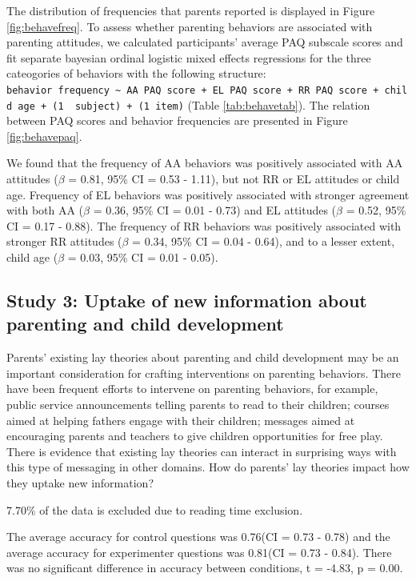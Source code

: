 \documentclass[man]{apa6}
\theoremstyle{definition}
\theoremstyle{definition}
\theoremstyle{definition}
\theoremstyle{remark}
\begin{document}
The distribution of frequencies that parents reported is displayed in
Figure \ref{fig:behavefreq}. To assess whether parenting behaviors are
associated with parenting attitudes, we calculated participants' average
PAQ subscale scores and fit separate bayesian ordinal logistic mixed
effects regressions for the three cateogories of behaviors with the
following structure:
\texttt{behavior\ frequency\ \textasciitilde{}\ AA\ PAQ\ score\ +\ EL\ PAQ\ score\ +\ RR\ PAQ\ score\ +\ child\ age\ +\ (1\ \textbar{}\ subject)\ +\ (1\textbar{}\ item)}
(Table \ref{tab:behavetab}). The relation between PAQ scores and
behavior frequencies are presented in Figure \ref{fig:behavepaq}.

We found that the frequency of AA behaviors was positively associated
with AA attitudes (\(\beta\) = 0.81, 95\% CI = 0.53 - 1.11), but not RR
or EL attitudes or child age. Frequency of EL behaviors was positively
associated with stronger agreement with both AA (\(\beta\) = 0.36, 95\%
CI = 0.01 - 0.73) and EL attitudes (\(\beta\) = 0.52, 95\% CI = 0.17 -
0.88). The frequency of RR behaviors was positively associated with
stronger RR attitudes (\(\beta\) = 0.34, 95\% CI = 0.04 - 0.64), and to
a lesser extent, child age (\(\beta\) = 0.03, 95\% CI = 0.01 - 0.05).

\subsection{Study 3: Uptake of new information about parenting and child
development}\label{study-3-uptake-of-new-information-about-parenting-and-child-development}

Parents' existing lay theories about parenting and child development may
be an important consideration for crafting interventions on parenting
behaviors. There have been frequent efforts to intervene on parenting
behaviors, for example, public service announcements telling parents to
read to their children; courses aimed at helping fathers engage with
their children; messages aimed at encouraging parents and teachers to
give children opportunities for free play. There is evidence that
existing lay theories can interact in surprising ways with this type of
messaging in other domains. How do parents' lay theories impact how they
uptake new information?

7.70\% of the data is excluded due to reading time exclusion.

The average accuracy for control questions was 0.76(CI = 0.73 - 0.78)
and the average accuracy for experimenter questions was 0.81(CI = 0.73 -
0.84). There was no significant difference in accuracy between
conditions, t = -4.83, p = 0.00.
\end{document}
